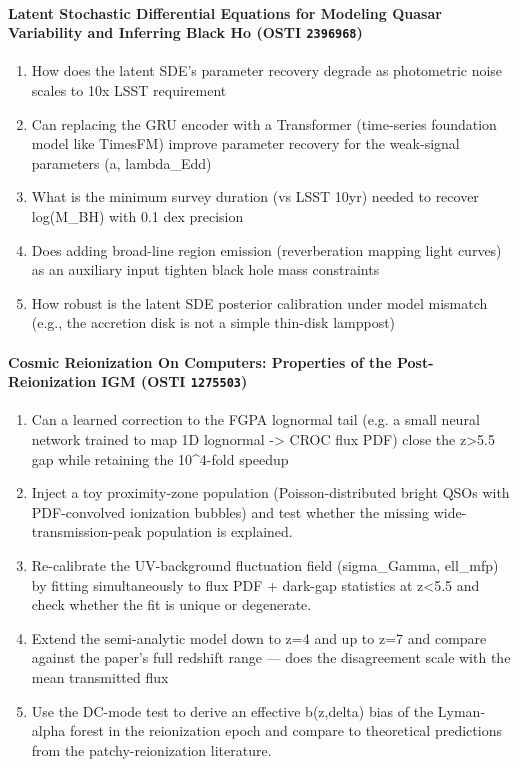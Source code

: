 \documentclass[11pt]{article}
\begin{document}
\paragraph{Latent Stochastic Differential Equations for Modeling Quasar Variability and Inferring Black Ho \textnormal{\small(OSTI \texttt{2396968})}}
\begin{enumerate}[leftmargin=1.6em,itemsep=0.2em,topsep=0.2em,label=Q\arabic*.]
\item How does the latent SDE's parameter recovery degrade as photometric noise scales to 10x LSST requirement
\item Can replacing the GRU encoder with a Transformer (time-series foundation model like TimesFM) improve parameter recovery for the weak-signal parameters (a, lambda\_Edd)
\item What is the minimum survey duration (vs LSST 10yr) needed to recover log(M\_BH) with 0.1 dex precision
\item Does adding broad-line region emission (reverberation mapping light curves) as an auxiliary input tighten black hole mass constraints
\item How robust is the latent SDE posterior calibration under model mismatch (e.g., the accretion disk is not a simple thin-disk lamppost)
\end{enumerate}
\paragraph{Cosmic Reionization On Computers: Properties of the Post-Reionization IGM \textnormal{\small(OSTI \texttt{1275503})}}
\begin{enumerate}[leftmargin=1.6em,itemsep=0.2em,topsep=0.2em,label=Q\arabic*.]
\item Can a learned correction to the FGPA lognormal tail (e.g. a small neural network trained to map 1D lognormal -\textgreater{} CROC flux PDF) close the z\textgreater{}5.5 gap while retaining the 10\textasciicircum{}4-fold speedup
\item Inject a toy proximity-zone population (Poisson-distributed bright QSOs with PDF-convolved ionization bubbles) and test whether the missing wide-transmission-peak population is explained.
\item Re-calibrate the UV-background fluctuation field (sigma\_Gamma, ell\_mfp) by fitting simultaneously to flux PDF + dark-gap statistics at z\textless{}5.5 and check whether the fit is unique or degenerate.
\item Extend the semi-analytic model down to z=4 and up to z=7 and compare against the paper's full redshift range --- does the disagreement scale with the mean transmitted flux
\item Use the DC-mode test to derive an effective b(z,delta) bias of the Lyman-alpha forest in the reionization epoch and compare to theoretical predictions from the patchy-reionization literature.
\end{enumerate}
\end{document}
